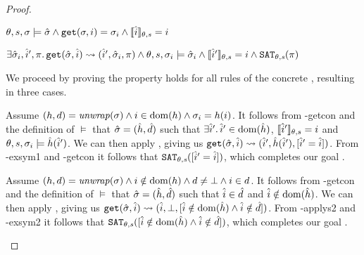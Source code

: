 \begin{proof}


\pfassume \begin{hypvlist}
 $\theta,s,\sigma \models \hat{\sigma} \land \texttt{get}(\sigma, i)=\sigma_i \land \llbracket\hat{i}\rrbracket_{\theta,s}=i$
\end{hypvlist}
\pfprove \begin{goalvlist}
 $\exists \hat{\sigma}_i, \hat{i}', \pi \ldotp \texttt{get}(\hat{\sigma},\hat{i})\rightsquigarrow(\hat{i}', \hat{\sigma}_i, \pi) \land \theta,s,\sigma_i\models\hat{\sigma}_i \land \llbracket\hat{i}'\rrbracket_{\theta,s}=i \land \texttt{SAT}_{\mathit{\theta,s}}(\pi)$
\end{goalvlist}

We proceed by proving the property holds for all rules of the concrete , resulting in three cases.


\begin{hypvlist}
 Assume $(h,d)={\operatorname{\mathit{unwrap}}}(\sigma) \land i\in\operatorname{dom}(h) \land \sigma_{i}=h(i)$.
 It follows from \hyp{getcon} and the definition of $\models$ that $\hat{\sigma}=(\hat{h}, \hat{d})$ such that $\exists \hat{i}'\ldotp \hat{i}' \in \operatorname{dom}(\hat{h})$, $\llbracket\hat{i}'\rrbracket_{\theta,s}=i$ and $\theta,s,\sigma_i\models \hat{h}(\hat{i}')$.
 We can then apply , giving us $\texttt{get}(\hat{\sigma},\hat{i})\rightsquigarrow(\hat{i}', \hat{h}(\hat{i}'), [\hat{i}' = \hat{i}])$.
 From \hyp{exsym1} and \hyp{getcon} it follows that $\texttt{SAT}_{\mathit{\theta,s}}([\hat{i}'=\hat{i}])$, which completes our goal .
\end{hypvlist}


\begin{hypvlist}
 Assume $(h,d)={\operatorname{\mathit{unwrap}}}(\sigma) \land i\notin\operatorname{dom}(h) \land d\neq\bot \land i\in d$.
 It follows from \hyp{getcon} and the definition of $\models$ that $\hat{\sigma}=(\hat{h}, \hat{d})$ such that $\hat{i}\in \hat{d}$ and $\hat{i}\notin \operatorname{dom}(\hat{h})$.
 We can then apply , giving us $\texttt{get}(\hat{\sigma},\hat{i})\rightsquigarrow(\hat{i},\bot,[\hat{i}\notin \operatorname{dom}(\hat{h}) \land \hat{i}\notin \hat{d}])$.%
 From \hyp{applys2} and \hyp{exsym2} it follows that $\texttt{SAT}_{\mathit{\theta,s}}([\hat{i}\notin \operatorname{dom}(\hat{h}) \land \hat{i}\notin \hat{d}])$, which completes our goal .
\end{hypvlist}



\end{proof}
